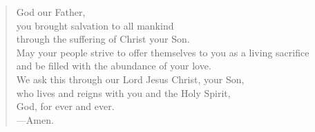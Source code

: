 \prayer

\setlength{\vleftmargin}{\prayerleftmargini}

\begin{verse}
God our Father,\\
you brought salvation to all mankind\\
through the suffering of Christ your Son.\\
May your people strive to offer themselves to you as a living sacrifice\\
and be filled with the abundance of your love.\\
We ask this through our Lord Jesus Christ, your Son,\\
who lives and reigns with you and the Holy Spirit,\\
God, for ever and ever.\\
{\color{red}---\thinspace}Amen.
\end{verse}

\setlength{\vleftmargin}{\defleftmargini}